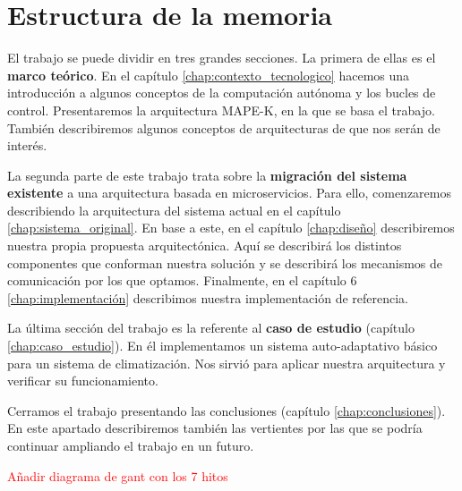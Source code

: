 \section{Estructura de la memoria}

El trabajo se puede dividir en tres grandes secciones. La primera de ellas es el \textbf{marco teórico}. En el capítulo \ref{chap:contexto_tecnologico} hacemos una introducción a algunos conceptos de la computación autónoma y los bucles de control. Presentaremos la arquitectura MAPE-K, en la que se basa el trabajo. También describiremos algunos conceptos de arquitecturas de  que nos serán de interés.

La segunda parte de este trabajo trata sobre la \textbf{migración del sistema existente} a una arquitectura basada en microservicios. Para ello, comenzaremos describiendo la arquitectura del sistema actual en el capítulo \ref{chap:sistema_original}. En base a este, en el capítulo \ref{chap:diseño} describiremos nuestra propia propuesta arquitectónica. Aquí se describirá los distintos componentes que conforman nuestra solución y se describirá los mecanismos de comunicación por los que optamos. Finalmente, en el capítulo 6 \ref{chap:implementación} describimos nuestra implementación de referencia.

La última sección del trabajo es la referente al \textbf{caso de estudio} (capítulo \ref{chap:caso_estudio}). En él implementamos un sistema auto-adaptativo básico para un sistema de climatización. Nos sirvió para aplicar nuestra arquitectura y verificar su funcionamiento.

Cerramos el trabajo presentando las conclusiones (capítulo \ref{chap:conclusiones}). En este apartado describiremos también las vertientes por las que se podría continuar ampliando el trabajo en un futuro.



\textcolor{red}{Añadir diagrama de gant con los 7 hitos}
